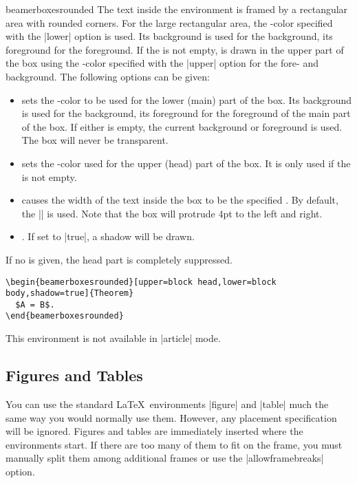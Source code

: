 \begin{environment}{{beamerboxesrounded}}
  The text inside the environment is framed by a rectangular area with rounded corners. For the large rectangular area, the \beamer-color specified with the |lower| option  is used. Its background is used for the background, its foreground for the foreground. If the  is not empty,  is drawn in the upper part of the box using the \beamer-color specified with the |upper| option for the fore- and background. The following options can be given:
  \begin{itemize}
  \item
     sets the \beamer-color to be used for the lower (main) part of the box. Its background is used for the background, its foreground for the foreground of the main part of the box. If either is empty, the current background or foreground is used. The box will never be transparent.
  \item
     sets the \beamer-color used for the upper (head) part of the box. It is only used if the  is not empty.
  \item
     causes the width of the text inside the box to be the specified . By default, the |\textwidth| is used. Note that the box will protrude 4pt to the left and right.
  \item
    . If set to |true|, a shadow will be drawn.
  \end{itemize}
  If no  is given, the head part is completely suppressed.
  \example
\begin{verbatim}
\begin{beamerboxesrounded}[upper=block head,lower=block body,shadow=true]{Theorem}
  $A = B$.
\end{beamerboxesrounded}
\end{verbatim}

  \articlenote
  This environment is not available in |article| mode.
\end{environment}


\subsection{Figures and Tables}

You can use the standard \LaTeX\ environments |figure| and |table| much the same way you would normally use them. However, any placement specification will be ignored. Figures and tables are immediately inserted where the environments start. If there are too many of them to fit on the frame, you must manually split them among additional frames or use the |allowframebreaks| option.

